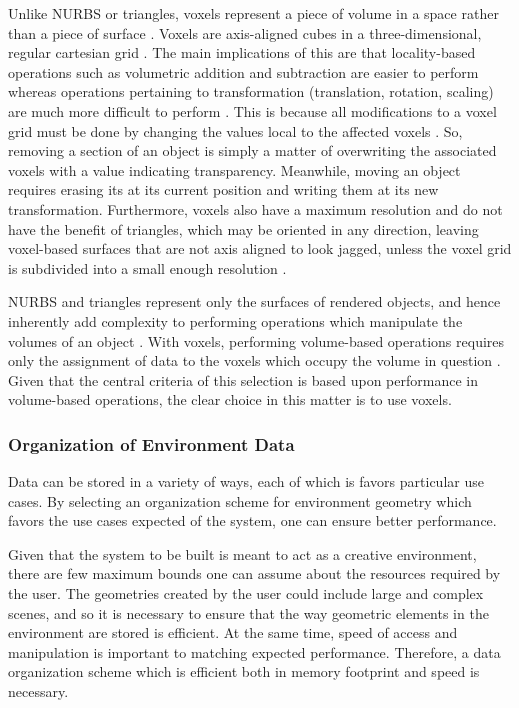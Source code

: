 \documentclass[onecolumn, draftclsnofoot,10pt, compsoc]{IEEEtran}
\newcounter{threesection}[subsubsection]
\begin{document}

Unlike NURBS or triangles, voxels represent a piece of volume in a space rather than a piece of surface \cite{1}.
Voxels are axis-aligned cubes in a three-dimensional, regular cartesian grid \cite{1}.
The main implications of this are that locality-based operations such as volumetric addition and subtraction are easier to perform whereas operations pertaining to transformation (translation, rotation, scaling) are much more difficult to perform \cite{1}.
This is because all modifications to a voxel grid must be done by changing the values local to the affected voxels \cite{1}.
So, removing a section of an object is simply a matter of overwriting the associated voxels with a value indicating transparency.
Meanwhile, moving an object requires erasing its at its current position and writing them at its new transformation.
Furthermore, voxels also have a maximum resolution and do not have the benefit of triangles, which may be oriented in any direction, leaving voxel-based surfaces that are not axis aligned to look jagged, unless the voxel grid is subdivided into a small enough resolution \cite{1}.




NURBS and triangles represent only the surfaces of rendered objects, and hence inherently add complexity to performing operations which manipulate the volumes of an object \cite{1}. With voxels, performing volume-based operations requires only the assignment of data to the voxels which occupy the volume in question \cite{1}. Given that the central criteria of this selection is based upon performance in volume-based operations, the clear choice in this matter is to use voxels. 


\subsubsection{Organization of Environment Data}

Data can be stored in a variety of ways, each of which is favors particular use cases. 
By selecting an organization scheme for environment geometry which favors the use cases expected of the system, one can ensure better performance.



Given that the system to be built is meant to act as a creative environment, there are few maximum bounds one can assume about the resources required by the user.
The geometries created by the user could include large and complex scenes, and so it is necessary to ensure that the way geometric elements in the environment are stored is efficient.
At the same time, speed of access and manipulation is important to matching expected performance.
Therefore, a data organization scheme which is efficient both in memory footprint and speed is necessary.
\end{document}
